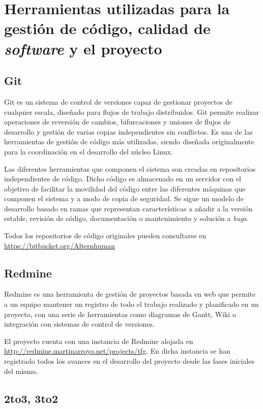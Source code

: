 \section{Herramientas utilizadas para la gestión de código, calidad de \textit{software} y el proyecto}

\subsection{Git}

Git es un sistema de control de versiones capaz de gestionar proyectos de cualquier escala, diseñado para flujos de trabajo distribuidos. Git permite realizar operaciones de reversión de cambios, bifurcaciones y uniones de flujos de desarrollo y gestión de varias copias independientes sin conflictos. Es una de las herramientas de gestión de código más utilizadas, siendo diseñada originalmente para la coordinación en el desarrollo del núcleo Linux.

Las diferentes herramientas que componen el sistema son creadas en repositorios independientes de código. Dicho código es almacenado en un servidor con el objetivo de facilitar la movilidad del código entre las diferentes máquinas que componen el sistema y a modo de copia de seguridad. Se sigue un modelo de desarrollo basado en ramas que representan características a añadir a la versión estable, revisión de código, documentación o mantenimiento y solución a \textit{bugs}.

Todos los repositorios de código originales pueden consultarse en \href{https://bitbucket.org/Alternhuman}{https://bitbucket.org/Alternhuman}

\subsection{Redmine}

Redmine es una herramienta de gestión de proyectos basada en web que permite a un equipo mantener un registro de todo el trabajo realizado y planificado en un proyecto, con una serie de herramientas como diagramas de Gantt, Wiki o integración con sistemas de control de versiones.

El proyecto cuenta con una instancia de Redmine alojada en \href{http://redmine.martinarroyo.net/}{http://redmine.martinarroyo.net/projects/tfg}. En dicha instancia se han registrado todos los avances en el desarrollo del proyecto desde las fases iniciales del mismo.


\subsection{2to3, 3to2}

